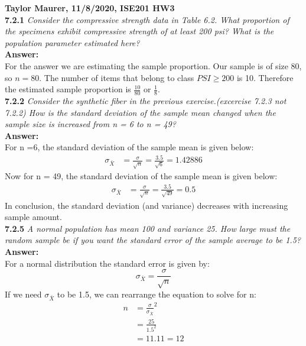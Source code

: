 \documentclass[11pt]{article}
\begin{document}
\textbf{Taylor Maurer, 11/8/2020, ISE201 HW3} \\
\noindent \textbf{7.2.1} \emph{ Consider the compressive strength data in Table 6.2. What proportion of the specimens exhibit compressive strength of at least 200 psi? What is the population parameter estimated here?}
\\\textbf{Answer:}
\\For the answer we are estimating the sample proportion. Our sample is of size 80, so $n=80$. The number of items that belong to class $PSI \geq 200$ is 10. Therefore the estimated sample proportion is $\frac{10}{80}$ or $\frac{1}{8}$.\\




\noindent \textbf{7.2.2} \emph{ Consider the synthetic fiber in the previous exercise.(excercise 7.2.3 not 7.2.2) How is the standard deviation of the sample mean changed when the sample size is increased from n = 6 to n = 49?}
\\\textbf{Answer:}
\\For n =6, the standard deviation of the sample mean is given below:
\begin{equation}
\begin{split}
\sigma_{\bar{X}} &= \frac{\sigma}{\sqrt{n}} = \frac{3.5}{\sqrt{6}} = 1.42886 
\end{split}
\end{equation}
Now for n = 49, the standard deviation of the sample mean is given below:
\begin{equation}
\begin{split}
\sigma_{\bar{X}} &= \frac{\sigma}{\sqrt{n}} = \frac{3.5}{\sqrt{49}} = 0.5
\end{split}
\end{equation}
In conclusion, the standard deviation (and variance) decreases with increasing sample amount.\\




\noindent \textbf{7.2.5} \emph{ A normal population has mean 100 and variance 25.
How large must the random sample be if you want the standard
error of the sample average to be 1.5?}
\\\textbf{Answer:}
\\For a normal distribution the standard error is given by:
\begin{equation}
\sigma_{\bar{X}} = \frac{\sigma}{\sqrt{n}}
\end{equation}
If we need $\sigma_{\bar{X}}$ to be 1.5, we can rearrange the equation to solve for n:
\begin{equation}
\begin{split}
n &= \frac{\sigma}{\sigma_{\bar{X}} }^2\\
& = \frac{25}{1.5^2} \\
&= 11.11 = 12
\end{split}
\end{equation}
\end{document}
